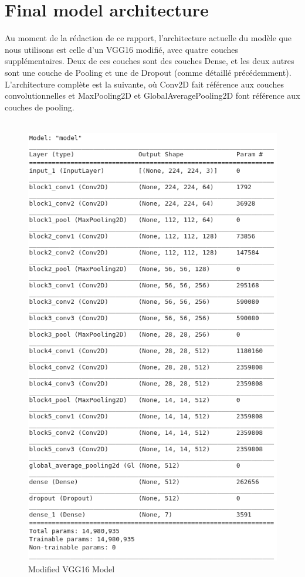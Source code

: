 \documentclass[11pt]{article}
\begin{document}
\section{Final model architecture}
Au moment de la rédaction de ce rapport, l'architecture actuelle du modèle que
nous utilisons est celle d'un VGG16 modifié, avec quatre couches
supplémentaires. Deux de ces couches sont des couches Dense, et les deux autres
sont une couche de Pooling et une de Dropout (comme détaillé
précédemment). L'architecture complète est la suivante, où Conv2D fait référence
aux couches convolutionnelles et MaxPooling2D et GlobalAveragePooling2D font
référence aux couches de pooling.\\\\
\begin{figure}[H]
  \centering
  \includegraphics[scale=0.5]{image/architecture.png}
  \caption{Modified VGG16 Model}
\end{figure}
\end{document}
